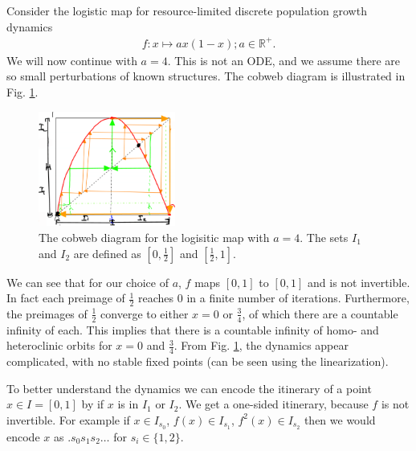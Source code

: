  \begin{ex}
 	Consider the logistic map for resource-limited discrete population growth dynamics
	\begin{align}
		f:x\mapsto ax(1-x); a \in \mathbb{R}^{+}.
	\end{align}
	We will now continue with $a=4$. This is not an ODE, and we assume there are so small perturbations of known structures. The cobweb diagram is illustrated in Fig. \ref{fig:logistic_cobweb}.
	\begin{figure}[h!]
		\centering
		\includegraphics[width=0.4\textwidth]{figures/ch6/23logisitic_cobweb.png}
		\caption{The cobweb diagram for the logisitic map with $a=4$. The sets $I_1$ and $I_2$ are defined as $[0, \frac{1}{2}]$ and $[\frac{1}{2}, 1]$.}
		\label{fig:logistic_cobweb}
	\end{figure}
	We can see that for our choice of $a$, $f$ maps $[0,1]$ to $[0,1]$ and is not invertible. In fact each preimage of $\frac{1}{2}$ reaches $0$ in a finite number of iterations. Furthermore, the preimages of $\frac{1}{2}$ converge to either $x=0$ or $\frac{3}{4}$, of which there are a countable infinity of each. This implies that there is a countable infinity of homo- and heteroclinic orbits for $x=0$ and $\frac{3}{4}$. From Fig. \ref{fig:logistic_cobweb}, the dynamics appear complicated, with no stable fixed points (can be seen using the linearization).

To better understand the dynamics we can encode the itinerary of a point $x\in I=[0,1]$ by if $x$ is in $I_{1}$ or $I_{2}$. We get a one-sided itinerary, because $f$ is not invertible. For example if $x\in I_{s_0}$, $f(x)\in I_{s_1}$, $f^{2}(x)\in I_{s_2}$ then we would encode $x$ as $\bm{.} s_0s_1s_2\ldots$ for $s_i \in \{ 1,2\}$.


\end{ex}
